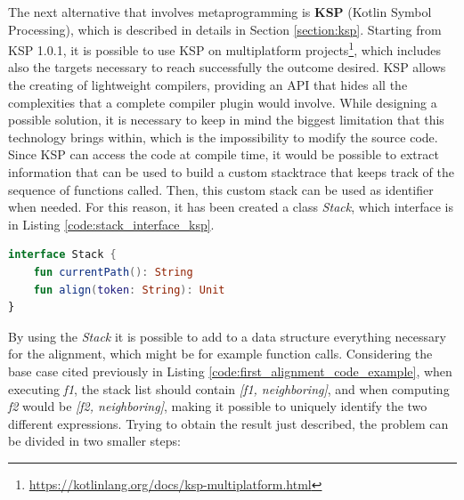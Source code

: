 The next alternative that involves metaprogramming is \textbf{KSP} (Kotlin Symbol Processing), which is described in details in Section \ref{section:ksp}. Starting from KSP 1.0.1, it is possible to use KSP on multiplatform projects\footnote{\url{https://kotlinlang.org/docs/ksp-multiplatform.html}}, which includes also the targets necessary to reach successfully the outcome desired.\newline
KSP allows the creating of lightweight compilers, providing an API that hides all the complexities that a complete compiler plugin would involve. While designing a possible solution, it is necessary to keep in mind the biggest limitation that this technology brings within, which is the impossibility to modify the source code.\newline
Since KSP can access the code at compile time, it would be possible to extract information that can be used to build a custom stacktrace that keeps track of the sequence of functions called. Then, this custom stack can be used as identifier when needed. For this reason, it has been created a class \textit{Stack}, which interface is in Listing \ref{code:stack_interface_ksp}.
\begin{lstlisting}[caption={Stack interface for KSP}, captionpos=b, language=Kotlin, label={code:stack_interface_ksp}]
interface Stack {
    fun currentPath(): String
    fun align(token: String): Unit
}
\end{lstlisting}
By using the \textit{Stack} it is possible to add to a data structure everything necessary for the alignment, which might be for example function calls. Considering the base case cited previously in Listing \ref{code:first_alignment_code_example}, when executing \textit{f1}, the stack list should contain \textit{[f1, neighboring]}, and when computing \textit{f2} would be \textit{[f2, neighboring]}, making it possible to uniquely identify the two different expressions.\newline
Trying to obtain the result just described, the problem can be divided in two smaller steps:
